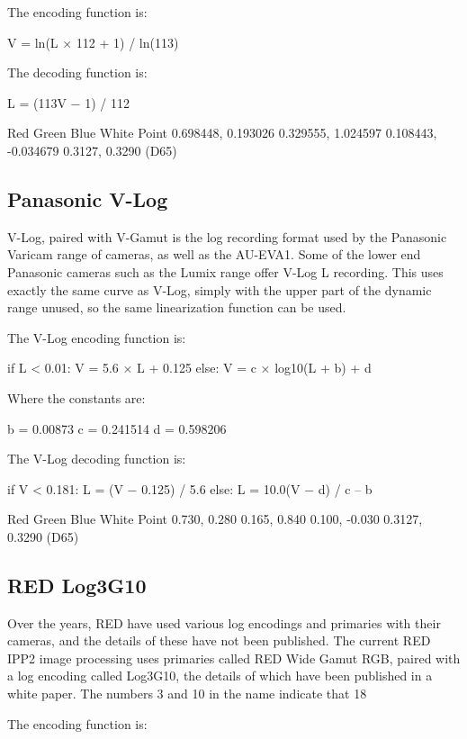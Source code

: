 The encoding function is:

	V = ln(L × 112 + 1) / ln(113)



The decoding function is:

	L = (113V − 1) / 112


Red
Green
Blue
White Point
0.698448, 0.193026
0.329555, 1.024597
0.108443, -0.034679
0.3127, 0.3290 (D65)

\subsection{Panasonic V-Log}
\label{subsec:panasonic-v-log}

V-Log, paired with V-Gamut is the log recording format used by the Panasonic Varicam range of cameras, as well as the AU-EVA1. Some of the lower end Panasonic cameras such as the Lumix range offer V-Log L recording. This uses exactly the same curve as V-Log, simply with the upper part of the dynamic range unused, so the same linearization function can be used.

The V-Log encoding function is:

	if L < 0.01:
		V = 5.6 × L + 0.125
	else:
		V = c × log10(L + b) + d

Where the constants are:

	b = 0.00873
c = 0.241514
d = 0.598206



The V-Log decoding function is:

	if V < 0.181:
		L = (V − 0.125) / 5.6
	else:
		L = 10.0(V − d) / c – b


Red
Green
Blue
White Point
0.730, 0.280
0.165, 0.840
0.100, -0.030
0.3127, 0.3290 (D65)

\subsection{RED Log3G10}
\label{subsec:red-log3g10}
Over the years, RED have used various log encodings and primaries with their cameras, and the details of these have not been published. The current RED IPP2 image processing uses primaries called RED Wide Gamut RGB, paired with a log encoding called Log3G10, the details of which have been published in a white paper. The numbers 3 and 10 in the name indicate that 18%

The encoding function is:

